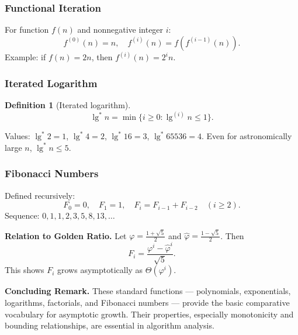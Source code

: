 \documentclass[12pt]{article}
\theoremstyle{definition}
\newtheorem{definition}{Definition}
\begin{document}
\subsubsection*{Functional Iteration}
For function $f(n)$ and nonnegative integer $i$:
\[
f^{(0)}(n) = n, \quad f^{(i)}(n) = f(f^{(i-1)}(n)).
\]
Example: if $f(n) = 2n$, then $f^{(i)}(n) = 2^i n$.

\subsubsection*{Iterated Logarithm}
\begin{definition}[Iterated logarithm]
\[
\lg^* n = \min \{ i \geq 0 : \lg^{(i)} n \leq 1 \}.
\]
\end{definition}
Values: $\lg^* 2 = 1$, $\lg^* 4 = 2$, $\lg^* 16 = 3$, $\lg^* 65536 = 4$.  
Even for astronomically large $n$, $\lg^* n \leq 5$.  

\subsubsection*{Fibonacci Numbers}
Defined recursively:
\[
F_0 = 0, \quad F_1 = 1, \quad F_i = F_{i-1} + F_{i-2} \quad (i \geq 2).
\]
Sequence: $0, 1, 1, 2, 3, 5, 8, 13, \dots$  

\noindent
\textbf{Relation to Golden Ratio.}  
Let $\varphi = \tfrac{1+\sqrt{5}}{2}$ and $\hat{\varphi} = \tfrac{1-\sqrt{5}}{2}$. Then
\[
F_i = \frac{\varphi^i - \hat{\varphi}^i}{\sqrt{5}}.
\]
This shows $F_i$ grows asymptotically as $\Theta(\varphi^i)$.  

\noindent
\textbf{Concluding Remark.}  
These standard functions — polynomials, exponentials, logarithms, factorials, and Fibonacci numbers — provide the basic comparative vocabulary for asymptotic growth. Their properties, especially monotonicity and bounding relationships, are essential in algorithm analysis.  
\end{document}
